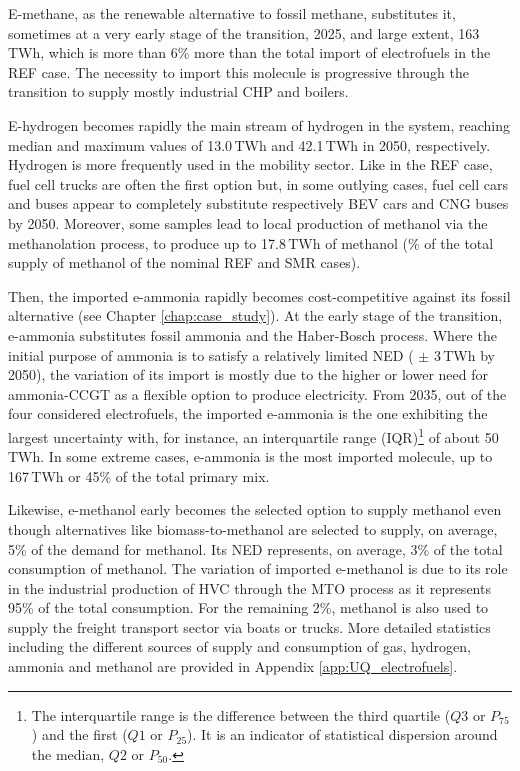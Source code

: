 E-methane, as the renewable alternative to fossil methane, substitutes it, sometimes at a very early stage of the transition, 2025, and large extent, 163\,TWh, which is more than 6\% more than the total import of electrofuels in the REF case. The necessity to import this molecule is progressive through the transition to supply mostly industrial \gls{CHP} and boilers. 

E-hydrogen becomes rapidly the main stream of hydrogen in the system, reaching median and maximum values of 13.0\,TWh and 42.1\,TWh in 2050, respectively. Hydrogen is more frequently used in the mobility sector. Like in the REF case, fuel cell trucks are often the first option but, in some outlying cases, fuel cell cars and buses appear to completely substitute respectively \gls{BEV} cars and \gls{CNG} buses by 2050. Moreover, some samples lead to local production of methanol via the methanolation process, to produce up to 17.8\,TWh of methanol (\% of the total supply of methanol of the nominal REF and SMR cases). 

Then, the imported e-ammonia rapidly becomes cost-competitive against its fossil alternative (see Chapter \ref{chap:case_study}). At the early stage of the transition, e-ammonia substitutes fossil ammonia and the Haber-Bosch process. Where the initial purpose of ammonia is to satisfy a relatively limited \acrfull{NED} ( $\pm$ 3\,TWh by 2050), the variation of its import is mostly due to the higher or lower need for ammonia-\gls{CCGT} as a flexible option to produce electricity. From 2035, out of the four considered electrofuels, the imported e-ammonia is the one exhibiting the largest uncertainty with, for instance, an interquartile range (IQR)\footnote{The interquartile range is the difference between the third quartile ($Q3$ or $P_{75}$) and the first ($Q1$ or $P_{25}$). It is an indicator of statistical dispersion around the median, $Q2$ or $P_{50}$.} of about 50\,TWh. In some extreme cases, e-ammonia is the most imported molecule, \ie up to 167\,TWh or 45\% of the total primary mix. 

Likewise, e-methanol early becomes the selected option to supply methanol even though alternatives like biomass-to-methanol are selected to supply, on average, 5\% of the demand for methanol. Its \gls{NED} represents, on average, 3\% of the total consumption of methanol. The variation of imported e-methanol is due to its role in the industrial production of \gls{HVC} through the \acrfull{MTO} process as it represents 95\% of the total consumption. For the remaining 2\%, methanol is also used to supply the freight transport sector via boats or trucks. More detailed statistics including the different sources of supply and consumption of gas, hydrogen, ammonia and methanol are provided in Appendix \ref{app:UQ_electrofuels}.\\

